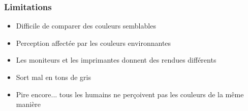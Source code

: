 \documentclass[aspectratio=169]{beamer}
\begin{document}
\begin{frame}[t]\frametitle{Limitations}


\begin{itemize}\setlength{\itemsep}{2pt}
	\item<1-> Difficile de comparer des couleurs semblables
	\item<2-> Perception affectée par les couleurs environnantes
	\item<4-> Les moniteurs et les imprimantes donnent des rendues différents
	\item<5-> Sort mal en tons de gris

	\item<6-> Pire encore... tous les humains ne perçoivent pas les couleurs de la même manière
\end{itemize}

\end{frame}
\end{document}
